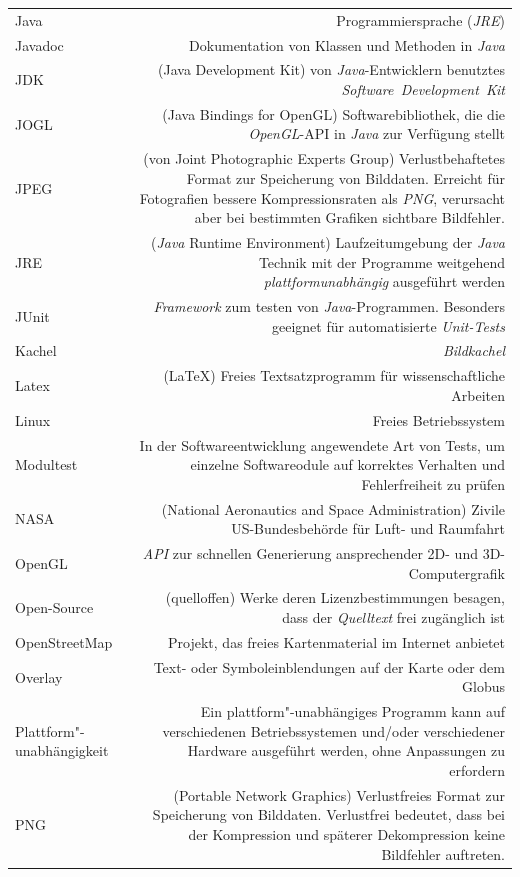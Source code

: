 \documentclass[10pt]{scrreprt}
\newcommand{\textref}[1]{\mbox{\raisebox{0.1ex}{\small$\rightarrow$ }\textit{#1}}}
\begin{document}
\begin{longtabu}{L{0.35} R{1.65}}
Java & Programmiersprache (\textref{JRE})\\
Javadoc & Dokumentation von Klassen und Methoden in \textref{Java}\\
JDK & (Java Development Kit) von \textref{Java}-Entwicklern benutztes \textref{Software Development Kit}\\
JOGL & (Java Bindings for OpenGL) Softwarebibliothek, die die \textref{OpenGL}-API in \textref{Java} zur Verfügung stellt\\
JPEG & (von Joint Photographic Experts Group) Verlustbehaftetes Format zur Speicherung von Bilddaten. Erreicht für Fotografien bessere Kompressionsraten als \textref{PNG}, verursacht aber bei bestimmten Grafiken sichtbare Bildfehler.\\
JRE & (\textref{Java} Runtime Environment) Laufzeitumgebung der \textref{Java} Technik mit der Programme weitgehend \textref{plattformunabhängig} ausgeführt werden\\
JUnit & \textref{Framework} zum testen von \textref{Java}-Programmen. Besonders geeignet für automatisierte \textref{Unit-Tests}\\
Kachel & \textref{Bildkachel}\\
Latex & (\LaTeX) Freies Textsatzprogramm für wissenschaftliche Arbeiten\\
Linux & Freies Betriebssystem\\
Modultest & In der Softwareentwicklung angewendete Art von Tests, um einzelne Softwareodule auf korrektes Verhalten und Fehlerfreiheit zu prüfen\\
NASA & (National Aeronautics and Space Administration) Zivile US-Bundesbehörde für Luft- und Raumfahrt\\
OpenGL & \textref{API} zur schnellen Generierung ansprechender 2D- und 3D-Computergrafik\\
Open-Source & (quelloffen) Werke deren Lizenzbestimmungen besagen, dass der \textref{Quelltext} frei zugänglich ist\\
OpenStreetMap & Projekt, das freies Kartenmaterial im Internet anbietet\\
Overlay & Text- oder Symboleinblendungen auf der Karte oder dem Globus\\
Plattform"-unabhängigkeit & Ein plattform"-unabhängiges Programm kann auf verschiedenen Betriebssystemen  und/oder verschiedener Hardware ausgeführt werden, ohne Anpassungen zu erfordern\\
PNG & (Portable Network Graphics) Verlustfreies Format zur Speicherung von Bilddaten. Verlustfrei bedeutet, dass bei der Kompression und späterer Dekompression keine Bildfehler auftreten.\\

\end{longtabu}
\end{document}
